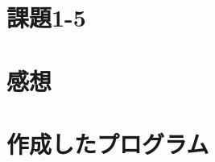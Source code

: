\documentclass[a4j,11pt]{jarticle}
\begin{document}


\section{課題1-5}


\section{感想}

\section{作成したプログラム}\label{sec:sourcecode}
%
%
{\fontsize{10pt}{11pt} \selectfont
\begin{verbatim}
\end{verbatim}
}

\end{document}
